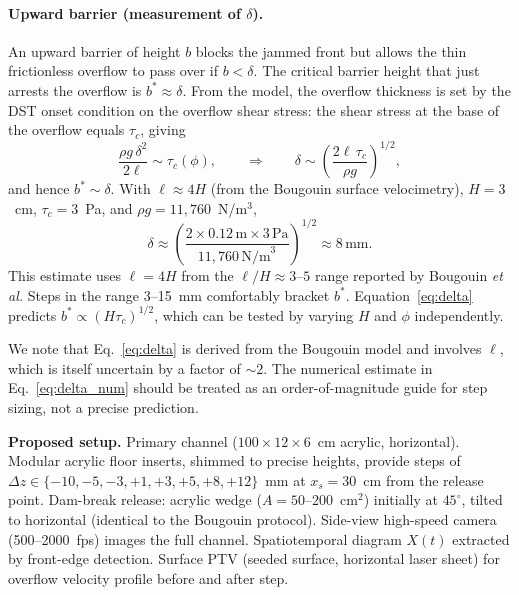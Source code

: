 \documentclass[aps,preprint,superscriptaddress,longbibliography]{revtex4-2}
\newcommand{\tauc}{\tau_c}
\begin{document}
\paragraph{Upward barrier (measurement of $\delta$).}
An upward barrier of height $b$ blocks the jammed front but allows the thin
frictionless overflow to pass over if $b < \delta$.  The critical barrier
height that just arrests the overflow is $b^* \approx \delta$.  From the model,
the overflow thickness is set by the DST onset condition on the overflow shear
stress: the shear stress at the base of the overflow equals $\tauc$, giving
\begin{equation}
  \frac{\rho g\,\delta^2}{2\ell} \sim \tauc(\phi),
  \qquad \Rightarrow \qquad
  \delta \sim \left(\frac{2\ell\,\tauc}{\rho g}\right)^{1/2},
  \label{eq:delta}
\end{equation}
and hence $b^* \sim \delta$.  With $\ell \approx 4H$ (from the Bougouin
surface velocimetry), $H = 3$~cm, $\tauc = 3$~Pa, and $\rho g = 11{,}760$~N/m$^3$,
\begin{equation}
  \delta \approx \left(\frac{2 \times 0.12\,\text{m} \times 3\,\text{Pa}}
  {11{,}760\,\text{N/m}^3}\right)^{1/2} \approx 8\,\text{mm}.
  \label{eq:delta_num}
\end{equation}
This estimate uses $\ell = 4H$ from the $\ell/H \approx 3$--$5$ range reported
by Bougouin \textit{et al.}  Steps in the range 3--15~mm comfortably bracket
$b^*$.  Equation~\eqref{eq:delta} predicts $b^* \propto (H\tauc)^{1/2}$, which
can be tested by varying $H$ and $\phi$ independently.

We note that Eq.~\eqref{eq:delta} is derived from the Bougouin model and
involves $\ell$, which is itself uncertain by a factor of $\sim 2$.  The
numerical estimate in Eq.~\eqref{eq:delta_num} should be treated as an
order-of-magnitude guide for step sizing, not a precise prediction.

\begin{mdframed}[style=setupbox]
\textbf{Proposed setup.}
Primary channel ($100 \times 12 \times 6$~cm acrylic, horizontal).  Modular
acrylic floor inserts, shimmed to precise heights, provide steps of
$\Delta z \in \{-10, -5, -3, +1, +3, +5, +8, +12\}$~mm at $x_s = 30$~cm
from the release point.  Dam-break release: acrylic wedge ($A = 50$--$200$~cm$^2$)
initially at $45^\circ$, tilted to horizontal (identical to the Bougouin
protocol).  Side-view high-speed camera (500--2000~fps) images the full
channel.  Spatiotemporal diagram $X(t)$ extracted by front-edge detection.
Surface PTV (seeded surface, horizontal laser sheet) for overflow velocity
profile before and after step.
\end{mdframed}
\end{document}
